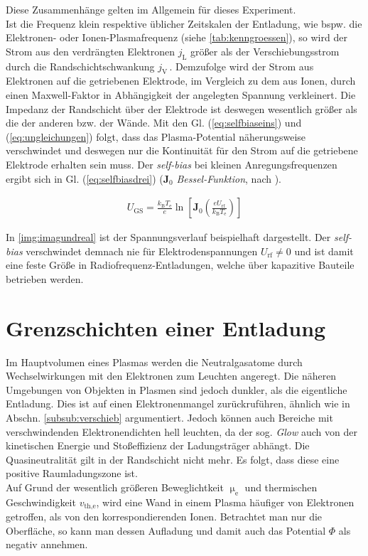 \documentclass[numbers=noenddot,a4paper,notitlepage,twoside,BCOR15mm]{scrbook}
\newcommand{\ix}[1]{_\text{#1}}
\newcommand{\tilt}[1]{\textit{#1}}
\begin{document}
					Diese Zusammenh\"ange gelten im Allgemein f\"ur dieses Experiment.\\
					Ist die Frequenz klein respektive \"ublicher Zeitskalen der Entladung, wie bspw. die Elektronen- oder Ionen-Plasmafrequenz (siehe \ref{tab:kenngroessen}), so wird der Strom aus den verdr\"angten Elektronen $j\ix{L}$ gr\"o{\ss}er als der Verschiebungsstrom durch die Randschichtschwankung $j\ix{V}\,$. Demzufolge wird der Strom aus Elektronen auf die getriebenen Elektrode, im Vergleich zu dem aus Ionen, durch einen Maxwell-Faktor in Abhängigkeit der angelegten Spannung verkleinert. Die Impedanz der Randschicht über der Elektrode ist deswegen wesentlich größer als die der anderen bzw. der Wände. Mit den Gl. (\ref{eq:selfbiaseins}) und (\ref{eq:ungleichungen}) folgt, dass das Plasma-Potential näherungsweise verschwindet und deswegen nur die Kontinuität für den Strom auf die getriebene Elektrode erhalten sein muss. Der \tilt{self-bias} bei kleinen Anregungsfrequenzen ergibt sich in Gl. (\ref{eq:selfbiasdrei}) ($\mathbf{J}\ix{0}$ \tilt{Bessel-Funktion}, nach \cite{Piel10}). 

						\begin{align}
							U\ix{GS}=\frac{k\ix{B}T\ix{e}}{e}\ln\left[\mathbf{J}\ix{0}\left(\frac{eU\ix{rf}}{k\ix{B}T\ix{e}}\right)\right] \label{eq:selfbiasdrei}
						\end{align}

					In \ref{img:imagundreal} ist der Spannungsverlauf beispielhaft dargestellt. Der \tilt{self-bias} verschwindet demnach nie für Elektrodenspannungen  $U\ix{rf}\neq0$ und ist damit eine feste Größe in Radiofrequenz-Entladungen, welche über kapazitive Bauteile betrieben werden.

		\section{Grenzschichten einer Entladung}\label{sub:rand}

			Im Hauptvolumen eines Plasmas werden die Neutralgasatome durch Wechselwirkungen mit den Elektronen zum Leuchten angeregt. Die näheren Umgebungen von Objekten in Plasmen sind jedoch dunkler, als die eigentliche Entladung. Dies ist auf einen Elektronenmangel zur\"uckruf\"uhren, ähnlich wie in Abschn. \ref{subsub:verschieb} argumentiert. Jedoch können auch Bereiche mit verschwindenden Elektronendichten hell leuchten, da der sog. \tilt{Glow} auch von der kinetischen Energie und Stoßeffizienz der Ladungsträger abhängt. Die Quasineutralit\"at gilt in der Randschicht nicht mehr. Es folgt, dass diese eine positive Raumladungszone ist. \\
			Auf Grund der wesentlich gr\"o{\ss}eren Beweglichtkeit $\upmu\ix{e}$ und thermischen Geschwindigkeit $v\ix{th,e}$, wird eine Wand in einem Plasma h\"aufiger von Elektronen getroffen, als von den korrespondierenden Ionen. Betrachtet man nur die Oberfl\"ache, so kann man dessen Aufladung und damit auch das Potential $\Phi$ als negativ annehmen.
\end{document}
